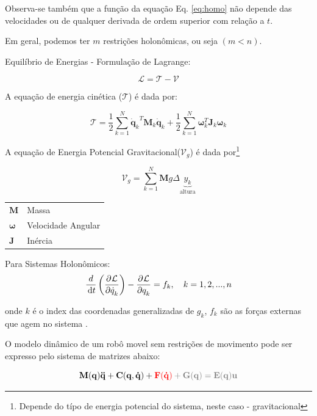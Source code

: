 Observa-se também que a função da equação Eq. \ref{eq:homo} não depende das velocidades ou de qualquer derivada de ordem superior com relação a $t$.

 Em geral, podemos ter $m$ restrições holonômicas, ou seja $(m<n)$.




 Equilíbrio de Energias - Formulação de Lagrange:

 \begin{equation}
     \mathcal{L}= \mathcal{T} - \mathcal{V}
 \end{equation}

A equação de energia cinética ($\mathcal{T}$) é dada por:

\begin{equation}
   \mathcal{T} = \frac{1}{2} \sum\limits_{k=1}^{N}{\mathbf{\dot{q}}_k}^T  \mathbf{M}_k {\mathbf{\dot{q}}_k}+ \frac{1}{2} \sum\limits_{k=1}^{N}\mathbf{\omega}_k^T \mathbf{J}_k \mathbf{\omega}_k
\end{equation}

A equação de Energia Potencial Gravitacional($\mathcal{V}_g$) é dada por\footnote{Depende do típo de energia potencial do sistema, neste caso - gravitacional}

\begin{equation}
   \mathcal{V}_g = \sum\limits_{k=1}^{N}\mathbf{M}g\Delta \underbrace{y_k}_{\text{altura}}
\end{equation}  


\begin{tabular}{l|l}
    $\mathbf{M}$               & Massa              \\
    $\mathbf{\omega}$ & Velocidade Angular \\
    $\mathbf{J}$               & Inércia         \\
\end{tabular}


Para Sistemas Holonômicos:
\begin{equation}
    \frac{d}{\,\mathrm{d}t}\left( \dfrac{\partial^{}\mathcal{L}}{\partial \dot{q}_k^{}}\right)
    -\dfrac{\partial^{}\mathcal{L}}{\partial q_k^{}}
    = f_k, \quad k = 1,2,...,n
\end{equation}


onde $k$ é o index das coordenadas generalizadas de $g_k$, $f_k$ são as forças externas que agem no sistema .

O modelo dinâmico de um robô movel sem restrições de movimento pode ser expresso pelo sistema de matrizes abaixo:

\begin{equation}
    \mathbf{M(q)\ddot{q}+ C(q, \dot{q})+ \color{red}{F(\dot{q})}\color{gray}+G(q) = E(q)u}
\end{equation}

